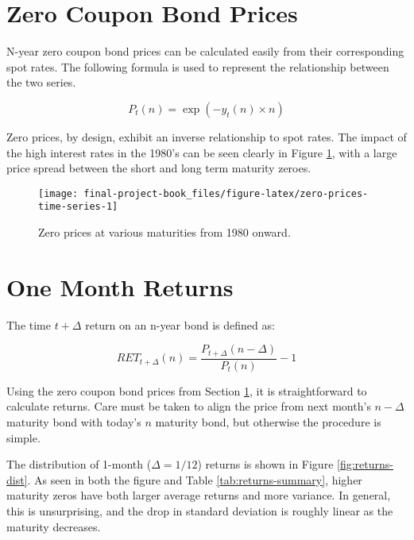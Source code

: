 \documentclass[openany]{book}
\theoremstyle{definition}
\theoremstyle{definition}
\theoremstyle{definition}
\theoremstyle{remark}
\begin{document}
\normalsize

\hypertarget{zero-prices}{%
\section{Zero Coupon Bond Prices}\label{zero-prices}}

N-year zero coupon bond prices can be calculated easily from their
corresponding spot rates. The following formula is used to represent the
relationship between the two series.

\[ P_t(n) = \exp(-y_t(n) \times n) \]

Zero prices, by design, exhibit an inverse relationship to spot rates.
The impact of the high interest rates in the 1980's can be seen clearly
in Figure \ref{fig:zero-prices-time-series}, with a large price spread
between the short and long term maturity zeroes.

\small

\begin{figure}[H]

{\centering \texttt{[image: final-project-book\_files/figure-latex/zero-prices-time-series-1]} 

}

\caption{Zero prices at various maturities from 1980 onward.}\label{fig:zero-prices-time-series}
\end{figure}

\normalsize

\hypertarget{one-month-returns}{%
\section{One Month Returns}\label{one-month-returns}}

The time \(t+\Delta\) return on an n-year bond is defined as:

\[ RET_{t+\Delta}(n) = \frac{P_{t+\Delta}(n - \Delta)}{P_t(n)} - 1 \]

Using the zero coupon bond prices from Section \ref{zero-prices}, it is
straightforward to calculate returns. Care must be taken to align the
price from next month's \(n-\Delta\) maturity bond with today's \(n\)
maturity bond, but otherwise the procedure is simple.

The distribution of 1-month (\(\Delta = 1/12\)) returns is shown in
Figure \ref{fig:returns-dist}. As seen in both the figure and Table
\ref{tab:returns-summary}, higher maturity zeros have both larger
average returns and more variance. In general, this is unsurprising, and
the drop in standard deviation is roughly linear as the maturity
decreases.
\end{document}
